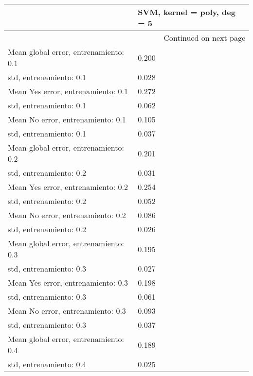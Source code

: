 \begin{longtable}{p{4cm}|p{1.5cm}}
\toprule
{} &  SVM, kernel = poly, deg = 5 \\
\midrule
\endhead
\midrule
\multicolumn{2}{r}{{Continued on next page}} \\
\midrule
\endfoot

\bottomrule
\endlastfoot
Mean global error, entrenamiento: 0.1 &                        0.200 \\
std, entrenamiento: 0.1               &                        0.028 \\
Mean Yes error, entrenamiento: 0.1    &                        0.272 \\
std, entrenamiento: 0.1               &                        0.062 \\
Mean No error, entrenamiento: 0.1     &                        0.105 \\
std, entrenamiento: 0.1               &                        0.037 \\
Mean global error, entrenamiento: 0.2 &                        0.201 \\
std, entrenamiento: 0.2               &                        0.031 \\
Mean Yes error, entrenamiento: 0.2    &                        0.254 \\
std, entrenamiento: 0.2               &                        0.052 \\
Mean No error, entrenamiento: 0.2     &                        0.086 \\
std, entrenamiento: 0.2               &                        0.026 \\
Mean global error, entrenamiento: 0.3 &                        0.195 \\
std, entrenamiento: 0.3               &                        0.027 \\
Mean Yes error, entrenamiento: 0.3    &                        0.198 \\
std, entrenamiento: 0.3               &                        0.061 \\
Mean No error, entrenamiento: 0.3     &                        0.093 \\
std, entrenamiento: 0.3               &                        0.037 \\
Mean global error, entrenamiento: 0.4 &                        0.189 \\
std, entrenamiento: 0.4               &                        0.025 \\

\end{longtable}

